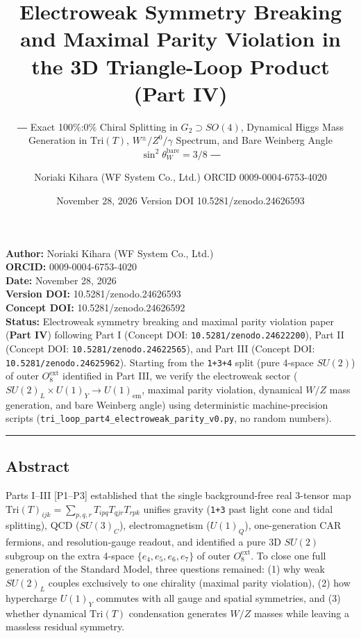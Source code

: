 \documentclass[
  a4paper,
]{article}
\title{Electroweak Symmetry Breaking and Maximal Parity Violation in the
3D Triangle-Loop Product (Part IV)}
\subtitle{― Exact 100\%:0\% Chiral Splitting in \(G_2 \supset SO(4)\),
Dynamical Higgs Mass Generation in \(\mathrm{Tri}(T)\),
\(W^\pm/Z^0/\gamma\) Spectrum, and Bare Weinberg Angle
\(\sin^2\theta_W^{\mathrm{bare}} = 3/8\) ―}
\author{Noriaki Kihara (WF System Co., Ltd.) ORCID 0009-0004-6753-4020}
\date{November 28, 2026 Version DOI 10.5281/zenodo.24626593}
\begin{document}
\maketitle

{
\setcounter{tocdepth}{2}
\tableofcontents
}
\textbf{Author:} Noriaki Kihara (WF System Co., Ltd.)\\
\textbf{ORCID:} 0009-0004-6753-4020\\
\textbf{Date:} November 28, 2026\\
\textbf{Version DOI:} 10.5281/zenodo.24626593\\
\textbf{Concept DOI:} 10.5281/zenodo.24626592\\
\textbf{Status:} Electroweak symmetry breaking and maximal parity
violation paper (\textbf{Part IV}) following Part I (Concept DOI:
\texttt{10.5281/zenodo.24622200}), Part II (Concept DOI:
\texttt{10.5281/zenodo.24622565}), and Part III (Concept DOI:
\texttt{10.5281/zenodo.24625962}). Starting from the \texttt{1+3+4}
split (pure 4-space \(SU(2)\)) of outer \(O_8^{\mathrm{ext}}\)
identified in Part III, we verify the electroweak sector
(\(SU(2)_L \times U(1)_Y \to U(1)_{\mathrm{em}}\), maximal parity
violation, dynamical \(W/Z\) mass generation, and bare Weinberg angle)
using deterministic machine-precision scripts
(\texttt{tri\_loop\_part4\_electroweak\_parity\_v0.py}, no random
numbers).

\begin{center}\rule{0.5\linewidth}{0.5pt}\end{center}

\subsection{Abstract}\label{abstract}

Parts I--III {[}P1--P3{]} established that the single background-free
real 3-tensor map
\(\mathrm{Tri}(T)_{ijk} = \sum_{p,q,r} T_{ipq} T_{qjr} T_{rpk}\) unifies
gravity (\texttt{1+3} past light cone and tidal splitting), QCD
(\(SU(3)_C\)), electromagnetism (\(U(1)_Q\)), one-generation CAR
fermions, and resolution-gauge readout, and identified a pure 3D
\(SU(2)\) subgroup on the extra 4-space \(\{e_4,e_5,e_6,e_7\}\) of outer
\(O_8^{\mathrm{ext}}\). To close one full generation of the Standard
Model, three questions remained: (1) why weak \(SU(2)_L\) couples
exclusively to one chirality (maximal parity violation), (2) how
hypercharge \(U(1)_Y\) commutes with all gauge and spatial symmetries,
and (3) whether dynamical \(\mathrm{Tri}(T)\) condensation generates
\(W/Z\) masses while leaving a massless residual symmetry.
\end{document}
